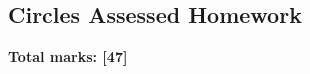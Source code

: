 \documentclass[../c1]{subfiles}
\begin{document}
\subsection*{Circles Assessed Homework}
\thispagestyle{fancy}



\begin{flushright}
\textbf{Total marks: [47]}
\end{flushright}
\end{document}
